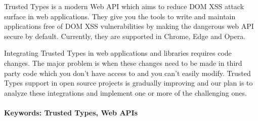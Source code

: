 \documentclass[12pt, twoside]{book}
\begin{document}
Trusted Types is a modern Web API which aims to reduce DOM XSS attack surface in web applications.
They give you the tools to write and maintain applications free of DOM XSS vulnerabilities by making
the dangerous web API secure by default. Currently, they are supported in Chrome, Edge and Opera.

Integrating Trusted Types in web applications and libraries requires code changes. The major problem
is when these changes need to be made in third party code which you don't have access to and you
can't easily modify. Trusted Types support in open source projects is gradually improving and our
plan is to analyze these integrations and implement one or more of the challenging ones.

\paragraph*{Keywords: Trusted Types, Web APIs}


%
%



\newpage

\tableofcontents



\newpage



\mainmatter








\end{document}
